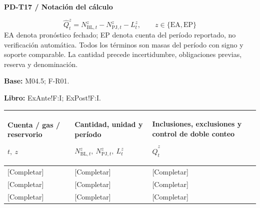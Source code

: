 \par\begingroup\sffamily\fontsize{8}{10}\selectfont\color{NEBGreen}\setlength{\parskip}{2pt}\setlength{\abovedisplayskip}{4pt}\setlength{\belowdisplayskip}{4pt}\setlength{\abovedisplayshortskip}{2pt}\setlength{\belowdisplayshortskip}{3pt}
\textbf{PD-T17 / Notación del cálculo}\par
{\fontsize{9}{11}\selectfont\[ \widehat Q_t^z=N_{\mathrm{BL},t}^z-N_{\mathrm{PJ},t}^z-L_t^z,\qquad z\in\{\mathrm{EA},\mathrm{EP}\} \]}
EA denota pronóstico fechado; EP denota cuenta del período reportado, no verificación automática. Todos los términos son masas del período con signo y soporte comparable. La cantidad precede incertidumbre, obligaciones previas, reserva y denominación.\par
\textbf{Base:} M04.5; F-R01.\par
\textbf{Libro:} ExAnte!F:I; ExPost!F:I.\par\endgroup
{\sffamily\fontsize{8.3}{10.3}\selectfont\begin{longtable}{@{}P{51.14mm} P{47.84mm} P{65.99mm}@{}}
\toprule
\textbf{Cuenta / gas / reservorio}\par {\normalfont\fontsize{8.2}{10}\selectfont $t,\ z$} & \textbf{Cantidad, unidad y período}\par {\normalfont\fontsize{8.2}{10}\selectfont $N_{\mathrm{BL},t}^z,\ N_{\mathrm{PJ},t}^z,\ L_t^z$} & \textbf{Inclusiones, exclusiones y control de doble conteo}\par {\normalfont\fontsize{8.2}{10}\selectfont $\widehat Q_t^z$}\\\midrule\endhead
\rule{0pt}{7.7mm}[Completar] & [Completar] & [Completar]\\\hline
\rule{0pt}{7.7mm}[Completar] & [Completar] & [Completar]\\\hline
\rule{0pt}{7.7mm}[Completar] & [Completar] & [Completar]\\\hline
\end{longtable}}

